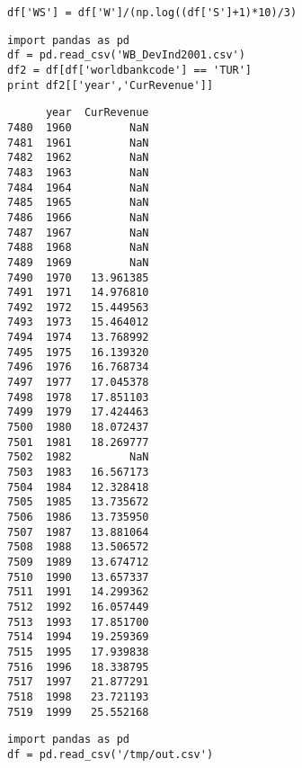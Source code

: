 \documentclass[12pt,fleqn]{article}\usepackage{common}
\begin{document}
\begin{verbatim}
df['WS'] = df['W']/(np.log((df['S']+1)*10)/3)
\end{verbatim}

\begin{verbatim}
import pandas as pd
df = pd.read_csv('WB_DevInd2001.csv')
df2 = df[df['worldbankcode'] == 'TUR']
print df2[['year','CurRevenue']]
\end{verbatim}

\begin{verbatim}
      year  CurRevenue
7480  1960         NaN
7481  1961         NaN
7482  1962         NaN
7483  1963         NaN
7484  1964         NaN
7485  1965         NaN
7486  1966         NaN
7487  1967         NaN
7488  1968         NaN
7489  1969         NaN
7490  1970   13.961385
7491  1971   14.976810
7492  1972   15.449563
7493  1973   15.464012
7494  1974   13.768992
7495  1975   16.139320
7496  1976   16.768734
7497  1977   17.045378
7498  1978   17.851103
7499  1979   17.424463
7500  1980   18.072437
7501  1981   18.269777
7502  1982         NaN
7503  1983   16.567173
7504  1984   12.328418
7505  1985   13.735672
7506  1986   13.735950
7507  1987   13.881064
7508  1988   13.506572
7509  1989   13.674712
7510  1990   13.657337
7511  1991   14.299362
7512  1992   16.057449
7513  1993   17.851700
7514  1994   19.259369
7515  1995   17.939838
7516  1996   18.338795
7517  1997   21.877291
7518  1998   23.721193
7519  1999   25.552168
\end{verbatim}

\begin{verbatim}
import pandas as pd
df = pd.read_csv('/tmp/out.csv')
\end{verbatim}
\end{document}
